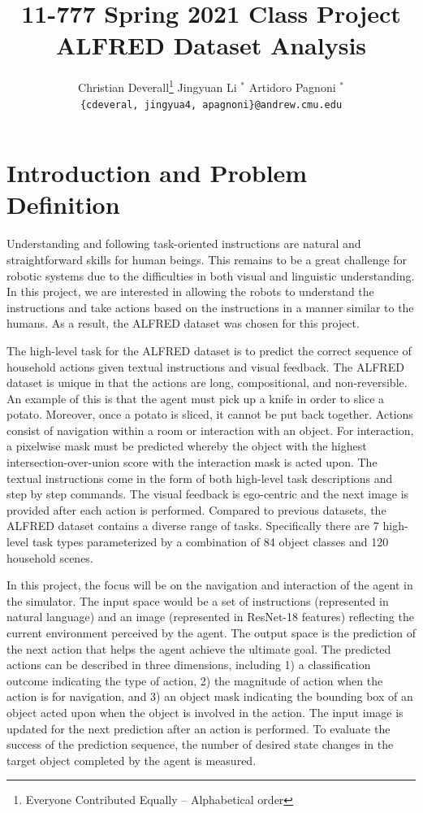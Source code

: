 \documentclass[11pt,a4paper]{article}
\title{11-777 Spring 2021 Class Project\\
ALFRED Dataset Analysis}
\author{
  Christian Deverall\thanks{\hspace{4pt}Everyone Contributed Equally -- Alphabetical order} \hspace{2em} Jingyuan Li $^*$ \hspace{2em} Artidoro Pagnoni $^*$ \\
  \texttt{\{cdeveral, jingyua4, apagnoni\}@andrew.cmu.edu}
  }
\date{}
\begin{document}
\maketitle

\section{Introduction and Problem Definition}
Understanding and following task-oriented instructions are natural and straightforward skills for human beings. This remains to be a great challenge for robotic systems due to the difficulties in both visual and linguistic understanding. In this project, we are interested in allowing the robots to understand the instructions and take actions based on the instructions in a manner similar to the humans. As a result, the ALFRED dataset \cite{ALFRED20} was chosen for this project.

The high-level task for the ALFRED dataset is to predict the correct sequence of household actions given textual instructions and visual feedback. The ALFRED dataset is unique in that the actions are long, compositional, and non-reversible. An example of this is that the agent must pick up a knife in order to slice a potato. Moreover, once a potato is sliced, it cannot be put back together. Actions consist of navigation within a room or interaction with an object. For interaction, a pixelwise mask must be predicted whereby the object with the highest intersection-over-union score with the interaction mask is acted upon. The textual instructions come in the form of both high-level task descriptions and step by step commands. The visual feedback is ego-centric and the next image is provided after each action is performed. Compared to previous datasets, the ALFRED dataset contains a diverse range of tasks. Specifically there are 7 high-level task types parameterized by a combination of 84 object classes and 120 household scenes.

In this project, the focus will be on the navigation and interaction of the agent in the simulator. The input space would be a set of instructions (represented in natural language) and an image (represented in ResNet-18 \cite{He_2016_CVPR} features) reflecting the current environment perceived by the agent. The output space is the prediction of the next action that helps the agent achieve the ultimate goal. The predicted actions can be described in three dimensions, including 1) a classification outcome indicating the type of action, 2) the magnitude of action when the action is for navigation, and 3) an object mask indicating the bounding box of an object acted upon when the object is involved in the action. The input image is updated for the next prediction after an action is performed. To evaluate the success of the prediction sequence, the number of desired state changes in the target object completed by the agent is measured.
\end{document}
